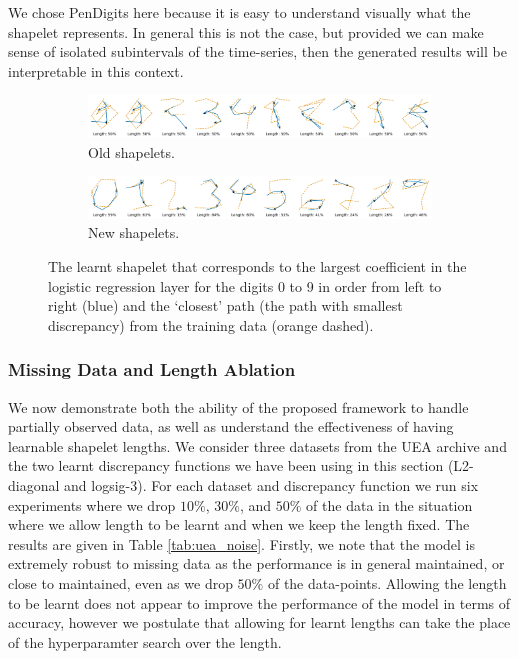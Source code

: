 We chose PenDigits here because it is easy to understand visually what the shapelet represents. In general this is not the case, but provided we can make sense of isolated subintervals of the time-series, then the generated results will be interpretable in this context.
\begin{figure}[ht]
    \begin{subfigure}[b]{\linewidth}
        \centering
        \includegraphics[width=\linewidth]{images/pendigits/old_shapelets_noborder.png}
        \caption{Old shapelets.}
        \label{fig:old_shapelets}
    \end{subfigure}
    \begin{subfigure}[b]{\linewidth}
        \centering
        \includegraphics[width=\linewidth]{images/pendigits/new_shapelets_noborder.png}
        \caption{New shapelets.}
        \label{fig:new_shapelets}
    \end{subfigure}
    \caption{The learnt shapelet that corresponds to the largest coefficient in the logistic regression layer for the digits 0 to 9 in order from left to right (blue) and the `closest' path (the path with smallest discrepancy) from the training data (orange dashed).}
    \label{fig:pendigits}
\end{figure}


\subsubsection{Missing Data and Length Ablation}
We now demonstrate both the ability of the proposed framework to handle partially observed data, as well as understand the effectiveness of having learnable shapelet lengths. We consider three datasets from the UEA archive and the two learnt discrepancy functions we have been using in this section (L2-diagonal and logsig-3). For each dataset and discrepancy function we run six experiments where we drop $10\%$, $30\%$, and $50\%$ of the data in the situation where we allow length to be learnt and when we keep the length fixed. The results are given in Table \ref{tab:uea_noise}. Firstly, we note that the model is extremely robust to missing data as the performance is in general maintained, or close to maintained, even as we drop $50\%$ of the data-points. Allowing the length to be learnt does not appear to improve the performance of the model in terms of accuracy, however we postulate that allowing for learnt lengths can take the place of the hyperparamter search over the length.
\begin{table}[ht]
    \caption{}
    \label{tab:uea_noise}
    \centering
    
\end{table}


